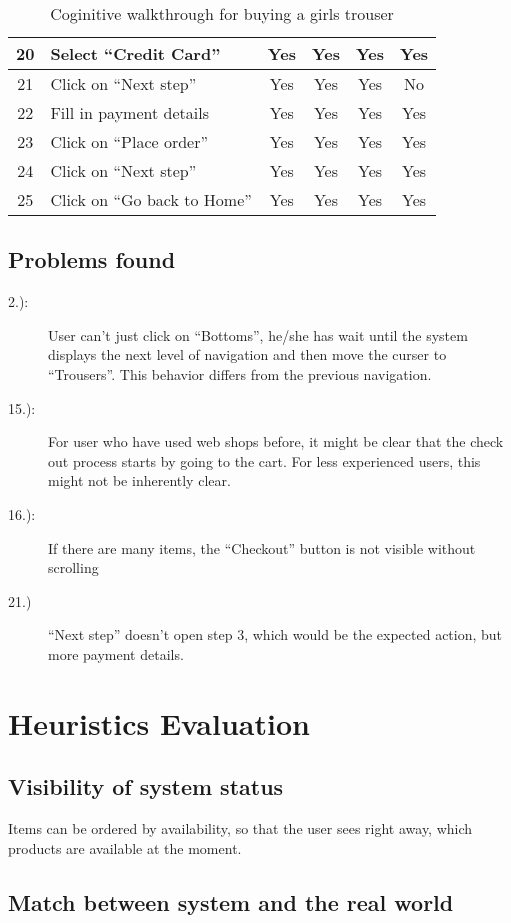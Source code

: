 \documentclass[fontsize=12pt,paper=a4]{scrartcl}
\begin{document}
\begin{table}[htdp]
\begin{center}
\begin{tabular}{|c|l|c|c|c|c|}
\hline
20 & Select ``Credit Card'' & Yes & Yes & Yes & Yes\\
\hline
21 & Click on ``Next step'' & Yes & Yes & Yes & No\\
\hline
22 & Fill in payment details & Yes & Yes & Yes & Yes\\
\hline
23 & Click on ``Place order'' & Yes & Yes & Yes & Yes\\
\hline
24 & Click on ``Next step'' & Yes & Yes & Yes & Yes\\
\hline
25 & Click on ``Go back to Home'' & Yes & Yes & Yes & Yes\\
\hline
\end{tabular}
\end{center}
\label{cog_walkthrough_girl_trouser}
\caption{Coginitive walkthrough for buying a girls trouser}
\end{table}%

\subsection{Problems found}
\begin{description}
\item[2.):] User can't just click on ``Bottoms'', he/she has wait until the system displays the next level of navigation and then move the curser to ``Trousers''. This behavior differs from the previous navigation. 
\item[15.):] For user who have used web shops before, it might be clear that the check out process starts by going to the cart. For less experienced users, this might not be inherently clear.
\item[16.):] If there are many items, the ``Checkout'' button is not visible without scrolling
\item[21.)] ``Next step'' doesn't open step 3, which would be the expected action, but more payment details. 
\end{description}

\section{Heuristics Evaluation}
\subsection{Visibility of system status}
Items can be ordered by availability, so that the user sees right away, which products are available at the moment. 


\subsection{Match between system and the real world}
\end{document}
